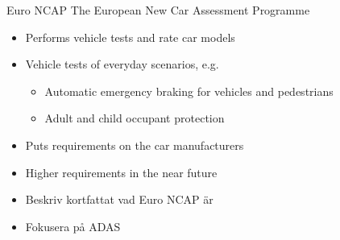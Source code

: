 \documentclass{beamer}
\newcommand{\eg}{e.g.\xspace}
\renewcommand{\a}{\r{a}\xspace}
\renewcommand{\aa}{\"a\xspace}
\begin{document}
\begin{frame}{Euro NCAP}
	The European New Car Assessment Programme
	\begin{itemize}
		\item Performs vehicle tests and rate car models
		\item Vehicle tests of everyday scenarios, \eg
		\begin{itemize}
			\item Automatic emergency braking for vehicles and pedestrians
			\item Adult and child occupant protection
		\end{itemize}
		\item Puts requirements on the car manufacturers
		\item Higher requirements in the near future
	\end{itemize}

	\note
	{
		\begin{itemize}
			\item Beskriv kortfattat vad Euro NCAP \aa{}r
			\item Fokusera p\a{} ADAS
		\end{itemize}
	}
\end{frame}
\end{document}
